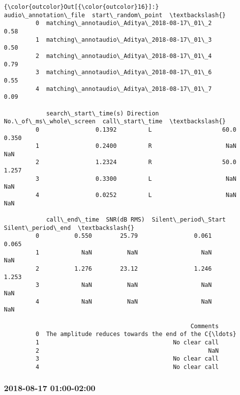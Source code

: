 \documentclass[11pt]{article}
\begin{document}
\begin{Verbatim}[commandchars=\\\{\}]
{\color{outcolor}Out[{\color{outcolor}16}]:}                         audio\_annotation\_file  start\_random\_point  \textbackslash{}
         0  matching\_annotaudio\_Aditya\_2018-08-17\_01\_2                0.58   
         1  matching\_annotaudio\_Aditya\_2018-08-17\_01\_3                0.50   
         2  matching\_annotaudio\_Aditya\_2018-08-17\_01\_4                0.79   
         3  matching\_annotaudio\_Aditya\_2018-08-17\_01\_6                0.55   
         4  matching\_annotaudio\_Aditya\_2018-08-17\_01\_7                0.09   
         
            search\_start\_time(s) Direction  No.\_of\_ms\_whole\_screen  call\_start\_time  \textbackslash{}
         0                0.1392         L                    60.0            0.350   
         1                0.2400         R                     NaN              NaN   
         2                1.2324         R                    50.0            1.257   
         3                0.3300         L                     NaN              NaN   
         4                0.0252         L                     NaN              NaN   
         
            call\_end\_time  SNR(dB RMS)  Silent\_period\_Start  Silent\_period\_end  \textbackslash{}
         0          0.550        25.79                0.061              0.065   
         1            NaN          NaN                  NaN                NaN   
         2          1.276        23.12                1.246              1.253   
         3            NaN          NaN                  NaN                NaN   
         4            NaN          NaN                  NaN                NaN   
         
                                                     Comments  
         0  The amplitude reduces towards the end of the C{\ldots}  
         1                                      No clear call  
         2                                                NaN  
         3                                      No clear call  
         4                                      No clear call  
\end{Verbatim}
            
    \hypertarget{section}{%
\subsubsection{2018-08-17 01:00-02:00}\label{section}}
\end{document}
